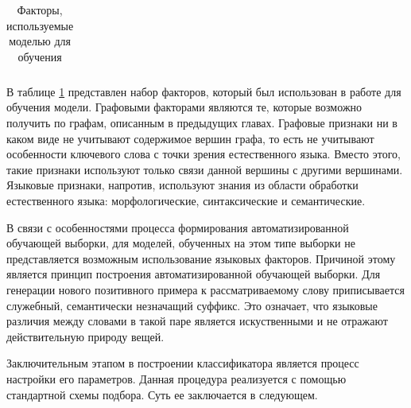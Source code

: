 \begin{longtable}{|p{5cm}|p{4cm}|p{5cm}|}
\caption{Факторы, используемые моделью для обучения} \label{tbl:features}
\end{longtable}


В таблице \ref{tbl:features} представлен набор факторов, который был использован в работе для обучения модели. Графовыми факторами являются те, которые возможно получить по графам, описанным в предыдущих главах. Графовые признаки ни в каком виде не учитывают содержимое вершин графа, то есть не учитывают особенности ключевого слова с точки зрения естественного языка. Вместо этого, такие признаки используют только связи данной вершины с другими вершинами. Языковые признаки, напротив, используют знания из области обработки естественного языка: морфологические, синтаксические и семантические.

В связи с особенностями процесса формирования автоматизированной обучающей выборки, для моделей, обученных на этом типе выборки не представляется возможным использование языковых факторов. Причиной этому является принцип построения автоматизированной обучающей выборки. Для генерации нового позитивного примера к рассматриваемому слову приписывается служебный, семантически незначащий суффикс. Это означает, что языковые различия между словами в такой паре является искуственными  и не отражают действительную природу вещей.

Заключительным этапом в построении классификатора является процесс настройки его параметров. Данная процедура реализуется с помощью стандартной схемы подбора. Суть ее заключается в следующем.

